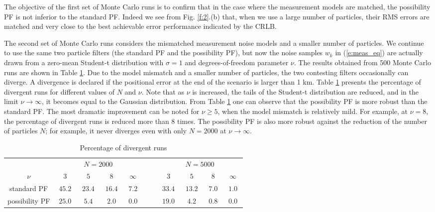 \documentclass{llncs}
\begin{document}
The objective of the first set of Monte Carlo runs is to confirm that in the case where the measurement models are matched, the possibility PF is not inferior to the standard PF. Indeed we see from Fig. \ref{f:2}.(b) that, when we use a large number of particles, their RMS errors are matched and very close to the best achievable error performance indicated by the CRLB.

The second set of Monte Carlo runs considers the mismatched measurement noise models and a smaller number of particles. We continue to use the same two particle filters (the standard PF and the possibility PF), but now the noise samples $w_k$  in (\ref{e:meas_eq}) are actually drawn from a zero-mean Student-t distribution with $\sigma=1$ and degrees-of-freedom parameter $\nu$. The results obtained from 500 Monte Carlo runs are shown in Table \ref{t:1}. Due to the model mismatch and a smaller number of particles, the two contesting filters occasionally can diverge. A divergence is declared if the positional error at the end of the scenario is larger than 1 km. Table \ref{t:1}  presents the percentage of divergent runs for different values of $N$ and $\nu$. Note that as $\nu$ is increased, the tails of the Student-t distribution are reduced, and in the limit $\nu\rightarrow\infty$, it becomes equal to the Gaussian distribution. From Table \ref{t:1} one can observe that the possibility PF is more robust than the standard PF. The most dramatic improvement can be noted for $\nu\geq 5$, when the model mismatch is relatively mild. For example, at $\nu=8$, the percentage of divergent runs is reduced more than 8 times. The possibility PF is also more robust against the reduction of the number of particles $N$; for example, it never diverges even with only $N=2000$ at $\nu\rightarrow \infty$.



\begin{table}[tbh]
\caption{Percentage of divergent runs}
\centering
\begin{tabular}{ccccccccccc}
\hline
& \multicolumn{4}{c}{$N=2000$} &&& \multicolumn{4}{c}{$N=5000$}
\\\cline{2-5}\cline{8-11}
 $\;\;\;\nu\;\;\;$    & $\;3\;$ & $\;5\;$  & $\;8\;$ & $\;\infty\;$ &&& $\;3\;$ & $\;5\;$  & $\;8\;$ & $\;\infty\;$ \\
\hline
standard PF\hspace{2mm} & $\;45.2\;$  & $\;23.4\;$  & $\;16.4\;$   & $\;7.2\;$ &&& $\;33.4\;$ & $\;13.2\;$  & $\;7.0\;$  & $\;1.0\;$\\
possibility PF\hspace{2mm} & $25.0$ & $5.4$  & $2.0$  & $0.0$   &&& $19.0$ & $4.2$  &  $0.8$ &  $0.0$ \\
\hline
\end{tabular}
\label{t:1}
\end{table}
\end{document}
